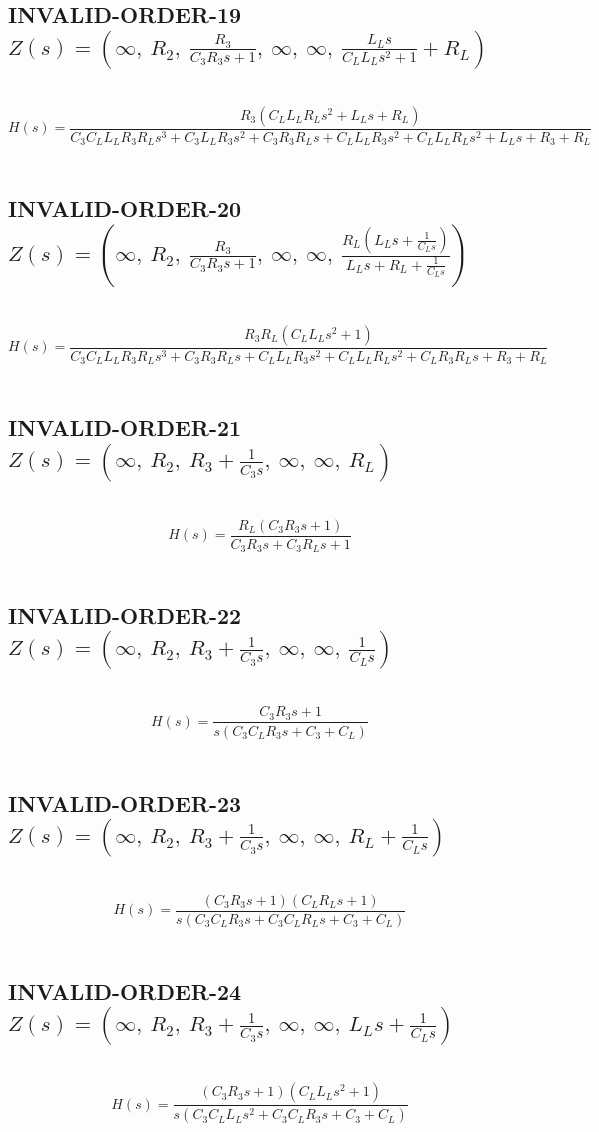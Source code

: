 \documentclass{article}
\begin{document}
\subsection{INVALID-ORDER-19 $Z(s) = \left( \infty, \  R_{2}, \  \frac{R_{3}}{C_{3} R_{3} s + 1}, \  \infty, \  \infty, \  \frac{L_{L} s}{C_{L} L_{L} s^{2} + 1} + R_{L}\right)$ } \ 
\textbf{\[H(s) = \frac{R_{3} \left(C_{L} L_{L} R_{L} s^{2} + L_{L} s + R_{L}\right)}{C_{3} C_{L} L_{L} R_{3} R_{L} s^{3} + C_{3} L_{L} R_{3} s^{2} + C_{3} R_{3} R_{L} s + C_{L} L_{L} R_{3} s^{2} + C_{L} L_{L} R_{L} s^{2} + L_{L} s + R_{3} + R_{L}}\] } \ 
\subsection{INVALID-ORDER-20 $Z(s) = \left( \infty, \  R_{2}, \  \frac{R_{3}}{C_{3} R_{3} s + 1}, \  \infty, \  \infty, \  \frac{R_{L} \left(L_{L} s + \frac{1}{C_{L} s}\right)}{L_{L} s + R_{L} + \frac{1}{C_{L} s}}\right)$ } \ 
\textbf{\[H(s) = \frac{R_{3} R_{L} \left(C_{L} L_{L} s^{2} + 1\right)}{C_{3} C_{L} L_{L} R_{3} R_{L} s^{3} + C_{3} R_{3} R_{L} s + C_{L} L_{L} R_{3} s^{2} + C_{L} L_{L} R_{L} s^{2} + C_{L} R_{3} R_{L} s + R_{3} + R_{L}}\] } \ 
\subsection{INVALID-ORDER-21 $Z(s) = \left( \infty, \  R_{2}, \  R_{3} + \frac{1}{C_{3} s}, \  \infty, \  \infty, \  R_{L}\right)$ } \ 
\textbf{\[H(s) = \frac{R_{L} \left(C_{3} R_{3} s + 1\right)}{C_{3} R_{3} s + C_{3} R_{L} s + 1}\] } \ 
\subsection{INVALID-ORDER-22 $Z(s) = \left( \infty, \  R_{2}, \  R_{3} + \frac{1}{C_{3} s}, \  \infty, \  \infty, \  \frac{1}{C_{L} s}\right)$ } \ 
\textbf{\[H(s) = \frac{C_{3} R_{3} s + 1}{s \left(C_{3} C_{L} R_{3} s + C_{3} + C_{L}\right)}\] } \ 
\subsection{INVALID-ORDER-23 $Z(s) = \left( \infty, \  R_{2}, \  R_{3} + \frac{1}{C_{3} s}, \  \infty, \  \infty, \  R_{L} + \frac{1}{C_{L} s}\right)$ } \ 
\textbf{\[H(s) = \frac{\left(C_{3} R_{3} s + 1\right) \left(C_{L} R_{L} s + 1\right)}{s \left(C_{3} C_{L} R_{3} s + C_{3} C_{L} R_{L} s + C_{3} + C_{L}\right)}\] } \ 
\subsection{INVALID-ORDER-24 $Z(s) = \left( \infty, \  R_{2}, \  R_{3} + \frac{1}{C_{3} s}, \  \infty, \  \infty, \  L_{L} s + \frac{1}{C_{L} s}\right)$ } \ 
\textbf{\[H(s) = \frac{\left(C_{3} R_{3} s + 1\right) \left(C_{L} L_{L} s^{2} + 1\right)}{s \left(C_{3} C_{L} L_{L} s^{2} + C_{3} C_{L} R_{3} s + C_{3} + C_{L}\right)}\] } \ 
\end{document}
